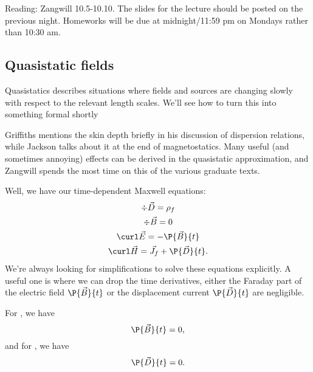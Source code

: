 \begin{note}
    Reading: Zangwill 10.5-10.10. The slides for the lecture should be posted on the previous night. Homeworks will be due at midnight/11:59 pm on Mondays rather than 10:30 am.
\end{note}

\subsection*{Quasistatic fields}
Quasistatics describes situations where fields and sources are changing slowly with respect to the relevant length scales. We'll see how to turn this into something formal shortly

Griffiths mentions the skin depth briefly in his discussion of dispersion relations, while Jackson talks about it at the end of magnetostatics. Many useful (and sometimes annoying) effects can be derived in the quasistatic approximation, and Zangwill spends the most time on this of the various graduate texts.

Well, we have our time-dependent Maxwell equations:
\begin{subequations}
    \begin{gather}
        \div \vec D = \rho_f\\
        \div \vec B = 0\\
        \curl \vec E = -\P{\vec B}{t}\\
        \curl \vec H = \vec J_f + \P{\vec D}{t}.
    \end{gather}
\end{subequations}
We're always looking for simplifications to solve these equations explicitly. A useful one is where we can drop the time derivatives, either the Faraday part of the electric field $\P{\vec B}{t}$ or the displacement current $\P{\vec D}{t}$ are negligible.

For , we have
\begin{equation}
    \P{\vec B}{t} =0,
\end{equation}
and for , we have
\begin{equation}
    \P{\vec D}{t} =0.
\end{equation}

